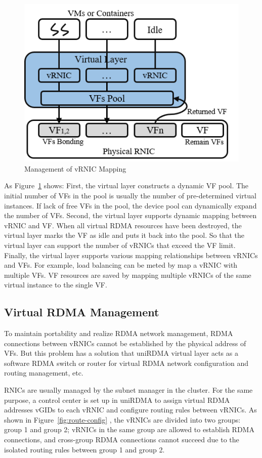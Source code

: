\begin{figure}[!ht]
	\centering
	\includegraphics[width=0.9\linewidth]{images/vf-mapping}
	\caption{Management of vRNIC Mapping}
	\label{fig:vf-mapping}
\end{figure}

As Figure~\ref{fig:vf-mapping} shows: First, the virtual layer constructs a dynamic VF pool. The initial number of VFs in the pool is usually the number of pre-determined virtual instances. If lack of free VFs in the pool, the device pool can dynamically expand the number of VFs. Second, the virtual layer supports dynamic mapping between vRNIC and VF. When all virtual RDMA resources have been destroyed, the virtual layer marks the VF as idle and puts it back into the pool. So that the virtual layer can support the number of vRNICs that exceed the VF limit. Finally, the virtual layer supports various mapping relationships between vRNICs and VFs. For example, load balancing can be meted by map a vRNIC with multiple VFs. VF resources are saved by mapping multiple vRNICs of the same virtual instance to the single VF. 


\subsection{Virtual RDMA Management}
To maintain portability and realize RDMA network management, RDMA connections between vRNICs cannot be established by the physical address of VFs. But this problem has a solution that uniRDMA virtual layer acts as a software RDMA switch or router for virtual RDMA network configuration and routing management, etc.

RNICs are usually managed by the subnet manager in the cluster. For the same purpose, a control center is set up in uniRDMA to assign virtual RDMA addresses vGIDs to each vRNIC and configure routing rules between vRNICs. As shown in Figure~\ref{fig:route-config} , the vRNICs are divided into two groups: group 1 and group 2; vRNICs in the same group are allowed to establish RDMA connections, and cross-group RDMA connections cannot succeed due to the isolated routing rules between group 1 and group 2.

